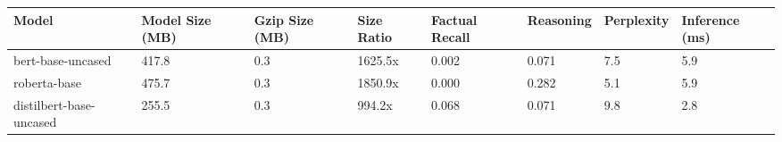 \begin{tabular}{llllllll}
\toprule
Model & Model Size (MB) & Gzip Size (MB) & Size Ratio & Factual Recall & Reasoning & Perplexity & Inference (ms) \\
\midrule
bert-base-uncased & 417.8 & 0.3 & 1625.5x & 0.002 & 0.071 & 7.5 & 5.9 \\
roberta-base & 475.7 & 0.3 & 1850.9x & 0.000 & 0.282 & 5.1 & 5.9 \\
distilbert-base-uncased & 255.5 & 0.3 & 994.2x & 0.068 & 0.071 & 9.8 & 2.8 \\
\bottomrule
\end{tabular}

